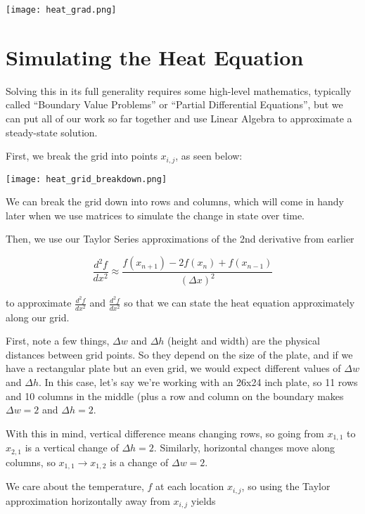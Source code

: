 \documentclass{ximera}
\begin{document}
\begin{center}
    \texttt{[image: heat\_grad.png]}
\end{center}

\section{Simulating the Heat Equation}

Solving this in its full generality requires some high-level mathematics, typically called  ``Boundary Value Problems'' or ``Partial Differential Equations'', but we can put all of our work so far together and use Linear Algebra to approximate a steady-state solution.

First, we break the grid into points $x_{i,j}$, as seen below:

\begin{center}
    \texttt{[image: heat\_grid\_breakdown.png]}
\end{center}

We can break the grid down into rows and columns, which will come in handy later when we use matrices to simulate the change in state over time.

Then, we use our Taylor Series approximations of the 2nd derivative from earlier 

$$\frac{d^2f}{dx^2}\approx \frac{f(x_{n+1})-2f(x_n)+f(x_{n-1})}{\left(\Delta x\right)^2}$$

to approximate $\frac{d^2f}{dx^2}$ and $\frac{d^2f}{dx^2}$ so that we can state the heat equation approximately along our grid. 

First, note a few things, $\Delta w$ and $\Delta h$ (height and width) are the physical distances between grid points. So they depend on the size of the plate, and if we have a rectangular plate but an even grid, we would expect different values of $\Delta w$ and $\Delta h$. In this case, let's say we're working with an 26x24 inch plate, so 11 rows and 10 columns in the middle (plus a row and column on the boundary makes $\Delta w=2$ and $\Delta h=2$.

With this in mind, vertical difference means changing rows, so going from $x_{1,1}$ to $x_{2,1}$ is a vertical change of $\Delta h=2$. Similarly, horizontal changes move along columns, so $x_{1,1}\rightarrow x_{1,2}$ is a change of $\Delta w=2$.

We care about the temperature, $f$ at each location $x_{i,j}$, so using the Taylor approximation horizontally away from $x_{i,j}$ yields
\end{document}
